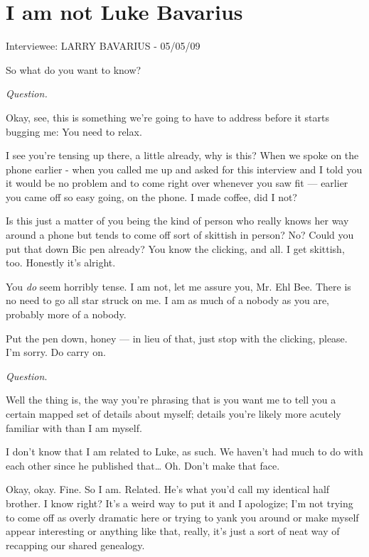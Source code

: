 \chapter{I am {\bf not} Luke Bavarius}


Interviewee: LARRY BAVARIUS - 05/05/09


So what do you want to know?


{\em Question.}


Okay, see, this is something we're going to have to address
before it starts bugging me: You need to relax.

I see you're tensing up there, a little already, why is this?
When we spoke on the phone earlier - when you called me up and
asked for this interview and I told you it would be no problem and
to come right over whenever you saw fit --- earlier you came
off so easy going, on the phone. I made coffee, did I not?

Is this just a matter of you being the kind of person who really
knows her way around a phone but tends to come off sort of skittish
in person? No? Could you put that down Bic pen already? You know
the clicking, and all. I get skittish, too. Honestly it's
alright.

You {\em do} seem horribly tense. I am not, let me assure you, Mr. Ehl
Bee. There is no need to go all star struck on me. I am as much of
a nobody as you are, probably more of a nobody.

Put the pen down, honey --- in lieu of that, just stop with the
clicking, please. I'm sorry. Do carry on.



{\em Question}.



Well the thing is, the way you're phrasing that is you want
me to tell you a certain mapped set of details about myself;
details you're likely more acutely familiar with than I am
myself.

I don't know that I am related to Luke, as such. We
haven't had much to do with each other since he published
that{\ldots} Oh. Don't make that face.

Okay, okay. Fine. So I am. Related. He's what you'd
call my identical half brother. I know right? It's a weird
way to put it and I apologize; I'm not trying to come off as
overly dramatic here or trying to yank you around or make myself
appear interesting or anything like that, really, it's just a
sort of neat way of recapping our shared genealogy.

